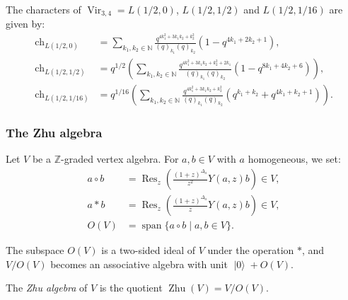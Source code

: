 \documentclass{beamer}
\DeclareMathOperator{\Vir}{Vir}
\DeclareMathOperator{\ch}{ch}
\DeclareMathOperator{\vspan}{span}
\DeclareMathOperator{\Res}{Res}
\DeclareMathOperator{\vac}{|0\rangle}
\DeclareMathOperator{\Zhu}{Zhu}
\begin{document}
\begin{frame}

  \begin{theorem}
    The characters of $\Vir_{3, 4} = L(1/2, 0)$, $L(1/2, 1/2)$ and $L(1/2, 1/16)$ are given by:
    \begin{align*}
      \ch_{L(1/2, 0)} &= \sum_{k_1, k_2 \in \mathbb{N}}\frac{q^{4k_1^2 + 3k_1k_2 + k_2^2}}{(q)_{k_1}(q)_{k_2}}(1 - q^{4k_1 + 2k_2 +1}), \\
      \ch_{L(1/2, 1/2)} &= q^{1/2}\left(\sum_{k_1, k_2 \in \mathbb{N}}\frac{q^{4k_1^2 +3k_1k_2 + k_2^2 + 2k_1}}{(q)_{k_1}(q)_{k_2}}(1 - q^{8k_1 + 4k_2 + 6})\right), \\
      \ch_{L(1/2, 1/16)} &= q^{1/16}\left(\sum_{k_1, k_2 \in \mathbb{N}}\frac{q^{4k_1^2 + 3k_1k_2 + k_2^2}}{(q)_{k_1}(q)_{k_2}}(q^{k_1 + k_2} + q^{4k_1 + k_2 + 1})\right).
    \end{align*}
  \end{theorem}

\end{frame}

\begin{frame}
  \frametitle{The Zhu algebra}

  Let $V$ be a $\mathbb{Z}$-graded vertex algebra.
  For $a, b \in V$ with $a$ homogeneous, we set:
  \begin{align*}
    a\circ b &= \Res_z\left(\frac{(1 + z)^{\Delta_a}}{z^2}Y(a, z)b\right) \in V, \\
    a*b &= \Res_z\left(\frac{(1 + z)^{\Delta_a}}{z}Y(a, z)b\right) \in V, \\
    O(V) &= \vspan\{a\circ b \mid a, b \in V\}.
  \end{align*}

  \begin{theorem}
    \label{thr:3}
    The subspace $O(V)$ is a two-sided ideal of $V$ under the operation $*$, and $V/O(V)$ becomes an associative algebra with unit $\vac + O(V)$.
  \end{theorem}

  The \emph{Zhu algebra} of $V$ is the quotient $\Zhu(V) = V/O(V)$.

\end{frame}
\end{document}
